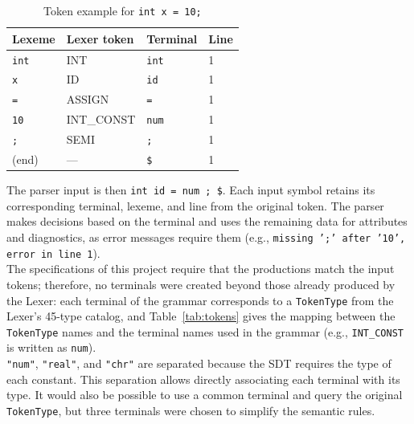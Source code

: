 \documentclass[12pt,letterpaper]{article}
\newcommand{\cod}[1]{\texttt{#1}} %
\newcommand{\anchotabla}{0.9\textwidth} %
\begin{document}
\begin{table}[H]
\centering
\renewcommand{\arraystretch}{1.2}
\begin{tabular}{@{}p{0.24\dimexpr\anchotabla} p{0.24\dimexpr\anchotabla} p{0.24\dimexpr\anchotabla} p{0.24\dimexpr\anchotabla}@{}}
\toprule
\textbf{Lexeme} & \textbf{Lexer token} & \textbf{Terminal} & \textbf{Line} \\
\midrule
\cod{int} & INT & \cod{int} & 1 \\
\cod{x} & ID & \cod{id} & 1 \\
\cod{=} & ASSIGN & \cod{=} & 1 \\
\cod{10} & INT\_CONST & \cod{num} & 1 \\
\cod{;} & SEMI & \cod{;} & 1 \\
(end) & --- & \cod{\$} & 1 \\
\bottomrule
\end{tabular}
\caption{Token example for \texttt{int x = 10;}}
\end{table}

The parser input is then \texttt{int id = num ; \$}. Each input symbol retains its corresponding terminal, lexeme, and line from the original token. The parser makes decisions based on the terminal and uses the remaining data for attributes and diagnostics, as error messages require them (e.g., \texttt{missing ';' after '10', error in line 1}).\\

The specifications of this project require that the productions match the input tokens; therefore, no terminals were created beyond those already produced by the Lexer: each terminal of the grammar corresponds to a \texttt{TokenType} from the Lexer's 45-type catalog, and Table~\ref{tab:tokens} gives the mapping between the \texttt{TokenType} names and the terminal names used in the grammar (e.g., \texttt{INT\_CONST} is written as \texttt{num}).\\

\texttt{"num"}, \texttt{"real"}, and \texttt{"chr"} are separated because the SDT requires the type of each constant. This separation allows directly associating each terminal with its type. It would also be possible to use a common terminal and query the original \texttt{TokenType}, but three terminals were chosen to simplify the semantic rules.\\
\end{document}
